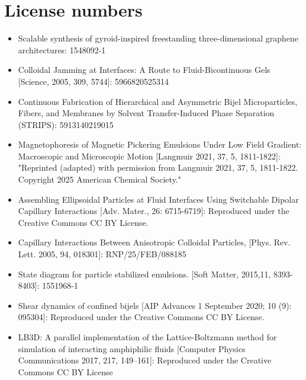 \section{License numbers}

\begin{itemize}
    \item Scalable synthesis of gyroid-inspired freestanding three-dimensional graphene architectures: 1548092-1
    \item Colloidal Jamming at Interfaces: A Route to Fluid-Bicontinuous Gels [Science, 2005, 309, 5744]: 5966820525314
    \item Continuous Fabrication of Hierarchical and Asymmetric Bijel Microparticles, Fibers, and Membranes by Solvent Transfer-Induced Phase Separation (STRIPS): 5913140219015
    \item Magnetophoresis of Magnetic Pickering Emulsions Under Low Field Gradient: Macroscopic and Microscopic 
    Motion [Langmuir 2021, 37, 5, 1811-1822]: "Reprinted (adapted) with permission from 
    Langmuir 2021, 37, 5, 1811-1822. Copyright 2025 American Chemical Society."
    \item Assembling Ellipsoidal Particles at Fluid Interfaces Using Switchable Dipolar Capillary Interactions [Adv. Mater., 26: 6715-6719]: Reproduced under the Creative Commons CC BY License.
    \item Capillary Interactions Between Anisotropic Colloidal Particles, [Phys. Rev. Lett. 2005, 94, 018301]: RNP/25/FEB/088185
    \item State diagram for particle stabilized emulsions. [Soft Matter, 2015,11, 8393-8403]: 1551968-1
    \item Shear dynamics of confined bijels [AIP Advances 1 September 2020; 10 (9): 095304]: Reproduced under the Creative Commons CC BY License.
    \item LB3D: A parallel implementation of the Lattice-Boltzmann method for simulation of interacting amphiphilic fluids [Computer Physics Communications 2017, 217, 149--161]: Reproduced under the Creative Commons CC BY License
\end{itemize}

